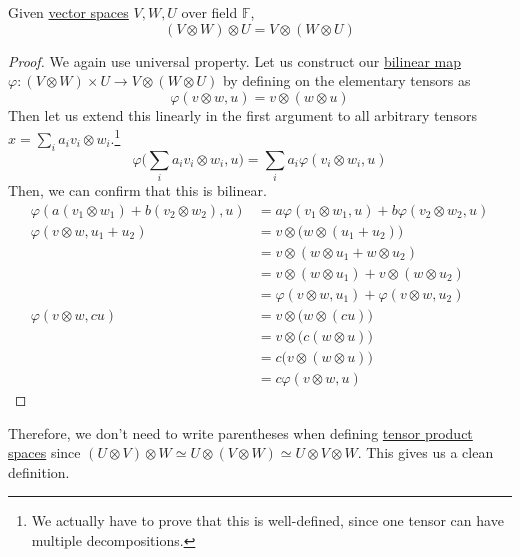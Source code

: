 	\begin{lemma}
	  \label{thm:associativity-of-tensor-products-on-spaces}
		Given \hyperref[def:vector-space]{vector spaces} $V, W, U$ over field $\mathbb{F}$, 
		\begin{equation}
			(V \otimes W) \otimes U = V \otimes (W \otimes U)
		\end{equation}
	\end{lemma}
	\begin{proof}
	  We again use universal property. Let us construct our \hyperref[def:bilinear-map]{bilinear map} $\varphi: (V \otimes W) \times U \to V \otimes (W \otimes U)$ by defining on the elementary tensors as 
		\begin{equation}
		  \varphi(v \otimes w, u) = v \otimes (w \otimes u)
		\end{equation}
		Then let us extend this linearly in the first argument to all arbitrary tensors $x = \sum_i a_i v_i \otimes w_i$.\footnote{We actually have to prove that this is well-defined, since one tensor can have multiple decompositions.} 
		\begin{equation}
		  \varphi \bigg( \sum_i a_i v_i \otimes w_i, u) = \sum_i a_i \varphi(v_i \otimes w_i, u)
		\end{equation}
		Then, we can confirm that this is bilinear. 
		\begin{align}
			\varphi(a (v_1 \otimes w_1) + b(v_2 \otimes w_2), u) & = a \varphi(v_1 \otimes w_1, u) + b \varphi(v_2 \otimes w_2, u) \\ 
			\varphi(v \otimes w, u_1 + u_2) & = v \otimes \big( w \otimes (u_1 + u_2)) \\ 
																			& = v \otimes (w \otimes u_1 + w \otimes u_2) \\ 
																			& = v \otimes (w \otimes u_1) + v \otimes (w \otimes u_2) \\ 
																			& = \varphi(v \otimes w, u_1) + \varphi(v \otimes w, u_2) \\ 
				\varphi(v \otimes w, cu) & = v \otimes \big(w \otimes (cu) \big) \\ 
																 & = v \otimes \big( c (w \otimes u) \big) \\ 
																 & = c \big( v \otimes (w \otimes u) \big) \\ 
																 & = c \varphi(v \otimes w, u)
		\end{align}
	\end{proof}

	Therefore, we don't need to write parentheses when defining \hyperref[def:tensor]{tensor product spaces} since $(U \otimes V) \otimes W \simeq U \otimes (V \otimes W) \simeq U \otimes V \otimes W$. This gives us a clean definition. 

